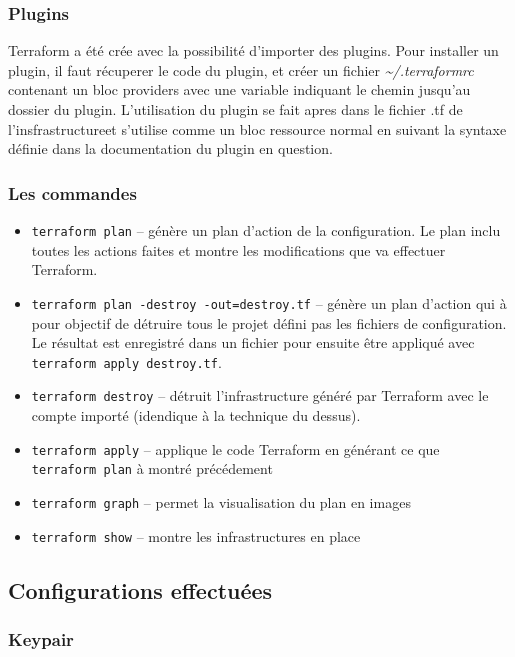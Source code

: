 \documentclass[]{article}
\providecommand{\tightlist}{%
  \setlength{\itemsep}{0pt}\setlength{\parskip}{0pt}}
\begin{document}
\subsubsection{Plugins}\label{plugins}

Terraform a été crée avec la possibilité d'importer des plugins. Pour
installer un plugin, il faut récuperer le code du plugin, et créer un
fichier \emph{\textasciitilde{}/.terraformrc} contenant un bloc
providers avec une variable indiquant le chemin jusqu'au dossier du
plugin. L'utilisation du plugin se fait apres dans le fichier .tf de
l'insfrastructureet s'utilise comme un bloc ressource normal en suivant
la syntaxe définie dans la documentation du plugin en question.

\subsubsection{Les commandes}\label{les-commandes}

\begin{itemize}
\tightlist
\item
  \texttt{terraform\ plan} -- génère un plan d'action de la
  configuration. Le plan inclu toutes les actions faites et montre les
  modifications que va effectuer Terraform.
\item
  \texttt{terraform\ plan\ -destroy\ -out=destroy.tf} -- génère un plan
  d'action qui à pour objectif de détruire tous le projet défini pas les
  fichiers de configuration. Le résultat est enregistré dans un fichier
  pour ensuite être appliqué avec \texttt{terraform\ apply\ destroy.tf}.
\item
  \texttt{terraform\ destroy} -- détruit l'infrastructure généré par
  Terraform avec le compte importé (idendique à la technique du dessus).
\item
  \texttt{terraform\ apply} -- applique le code Terraform en générant ce
  que \texttt{terraform\ plan} à montré précédement
\item
  \texttt{terraform\ graph} -- permet la visualisation du plan en images
\item
  \texttt{terraform\ show} -- montre les infrastructures en place
\end{itemize}

\subsection{Configurations
effectuées}\label{configurations-effectuuxe9es}

\subsubsection{Keypair}\label{keypair}
\end{document}
